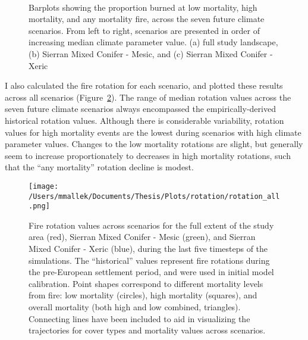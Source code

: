 \begin{figure}[!htbp]
  \centering
     \\
    \caption{Barplots showing the proportion burned at low mortality, high mortality, and any mortality fire, across the seven future climate scenarios. From left to right, scenarios are presented in order of increasing median climate parameter value. (a) full study landscape, (b) Sierran Mixed Conifer - Mesic, and (c) Sierran Mixed Conifer - Xeric}
  \label{fig:dareacomp}
\end{figure}

I also calculated the fire rotation for each scenario, and plotted these results across all scenarios (Figure~\ref{fig:frotation}). The range of median rotation values across the seven future climate scenarios always encompassed the empirically-derived historical rotation values. Although there is considerable variability, rotation values for high mortality events are the lowest during scenarios with high climate parameter values. Changes to the low mortality rotations are slight, but generally seem to increase proportionately to decreases in high mortality rotations, such that the ``any mortality'' rotation decline is modest.



\begin{figure}
\centering
\texttt{[image: /Users/mmallek/Documents/Thesis/Plots/rotation/rotation\_all.png]}
\caption{Fire rotation values across scenarios for the full extent of the study area (red), Sierran Mixed Conifer - Mesic (green), and Sierran Mixed Conifer - Xeric (blue), during the last five timesteps of the simulations. The ``historical'' values represent fire rotations during the pre-European settlement period, and were used in initial model calibration. Point shapes correspond to different mortality levels from fire: low mortality (circles), high mortality (squares), and overall mortality (both high and low combined, triangles). Connecting lines have been included to aid in visualizing the trajectories for cover types and mortality values across scenarios.}
\label{fig:frotation}
\end{figure}



